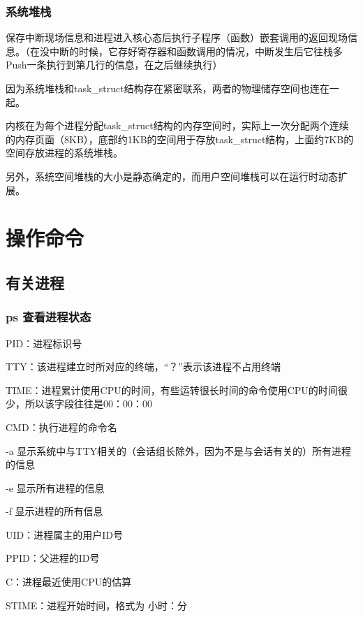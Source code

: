 \documentclass{ctexart}
\begin{document}

\subsubsection{系统堆栈}
保存中断现场信息和进程进入核心态后执行子程序（函数）嵌套调用的返回现场信息。（在没中断的时候，它存好寄存器和函数调用的情况，中断发生后它往栈多Push一条执行到第几行的信息，在之后继续执行）

因为系统堆栈和task\_struct结构存在紧密联系，两者的物理储存空间也连在一起。

内核在为每个进程分配task\_struct结构的内存空间时，实际上一次分配两个连续的内存页面（8KB），底部约1KB的空间用于存放task\_struct结构，上面约7KB的空间存放进程的系统堆栈。

另外，系统空间堆栈的大小是静态确定的，而用户空间堆栈可以在运行时动态扩展。

\section{操作命令}
\subsection{有关进程}
\subsubsection{ps 查看进程状态}
PID：进程标识号

TTY：该进程建立时所对应的终端，“？”表示该进程不占用终端

TIME：进程累计使用CPU的时间，有些运转很长时间的命令使用CPU的时间很少，所以该字段往往是00：00：00

CMD：执行进程的命令名

\vspace{\baselineskip}

-a 显示系统中与TTY相关的（会话组长除外，因为不是与会话有关的）所有进程的信息

-e 显示所有进程的信息

-f 显示进程的所有信息

UID：进程属主的用户ID号

PPID：父进程的ID号

C：进程最近使用CPU的估算

STIME：进程开始时间，格式为 小时：分
\end{document}
